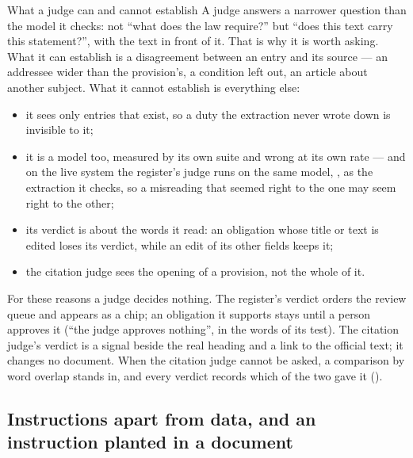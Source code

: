 \begin{aibox}{What a judge can and cannot establish}
A judge answers a narrower question than the model it checks: not \enquote{what does the
law require?} but \enquote{does this text carry this statement?}, with the text in front of
it. That is why it is worth asking. What it can establish is a disagreement between an
entry and its source --- an addressee wider than the provision's, a condition left out, an
article about another subject. What it cannot establish is everything else:
\begin{itemize}
  \item it sees only entries that exist, so a duty the extraction never wrote down is
    invisible to it;
  \item it is a model too, measured by its own suite and wrong at its own rate --- and on the
    live system the register's judge runs on the same model, , as the
    extraction it checks, so a misreading that seemed right to the one may seem right to the
    other;
  \item its verdict is about the words it read: an obligation whose title or text is edited
    loses its verdict, while an edit of its other fields keeps it;
  \item the citation judge sees the opening of a provision, not the whole of it.
\end{itemize}
For these reasons a judge decides nothing. The register's verdict orders the review queue
and appears as a chip; an obligation it supports stays  until a person
approves it (\enquote{the judge approves nothing}, in the words of its test). The citation
judge's verdict is a signal beside the real heading and a link to the official text; it
changes no document. When the citation judge cannot be asked, a comparison by word overlap
stands in, and every verdict records which of the two gave it ().
\end{aibox}

\subsection{Instructions apart from data, and an instruction planted in a document}\label{sec:control:injection}

